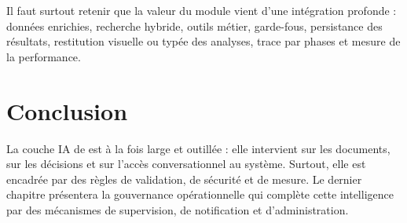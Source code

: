 Il faut surtout retenir que la valeur du module vient d'une intégration profonde : données enrichies, recherche hybride, outils métier, garde-fous, persistance des résultats, restitution visuelle ou typée des analyses, trace par phases et mesure de la performance.

\section*{Conclusion}
La couche IA de \projectname{} est à la fois large et outillée : elle intervient sur les documents, sur les décisions et sur l'accès conversationnel au système. Surtout, elle est encadrée par des règles de validation, de sécurité et de mesure. Le dernier chapitre présentera la gouvernance opérationnelle qui complète cette intelligence par des mécanismes de supervision, de notification et d'administration.
